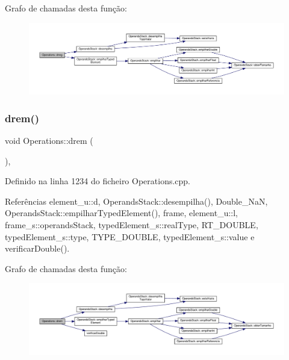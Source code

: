 Grafo de chamadas desta função\+:\nopagebreak
\begin{figure}[H]
\begin{center}
\leavevmode
\includegraphics[width=350pt]{classOperations_a04f5d4f85b80f4c04216cd0259d3d7dc_cgraph}
\end{center}
\end{figure}
\mbox{\label{classOperations_abe333415749dbd2331ce89dc5e2233c5}} 
\subsubsection{\texorpdfstring{drem()}{drem()}}
{\footnotesize\ttfamily void Operations\+::drem (\begin{DoxyParamCaption}{ }\end{DoxyParamCaption})\hspace{0.3cm}{\ttfamily [static]}, {\ttfamily [private]}}



Definido na linha 1234 do ficheiro Operations.\+cpp.



Referências element\+\_\+u\+::d, Operands\+Stack\+::desempilha(), Double\+\_\+\+NaN, Operands\+Stack\+::empilhar\+Typed\+Element(), frame, element\+\_\+u\+::l, frame\+\_\+s\+::operands\+Stack, typed\+Element\+\_\+s\+::real\+Type, R\+T\+\_\+\+D\+O\+U\+B\+LE, typed\+Element\+\_\+s\+::type, T\+Y\+P\+E\+\_\+\+D\+O\+U\+B\+LE, typed\+Element\+\_\+s\+::value e verificar\+Double().

Grafo de chamadas desta função\+:\nopagebreak
\begin{figure}[H]
\begin{center}
\leavevmode
\includegraphics[width=350pt]{classOperations_abe333415749dbd2331ce89dc5e2233c5_cgraph}
\end{center}
\end{figure}
\mbox{\label{classOperations_a85ce8267820ffcc1e1530d533545c9f3}} 
